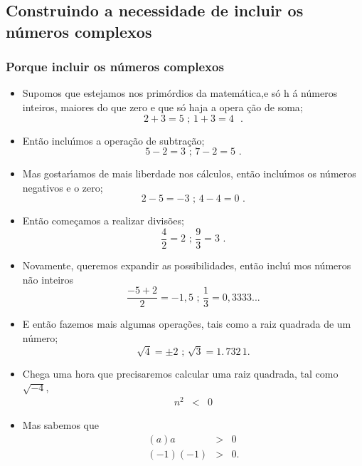 \documentclass[xcolor=table]{beamer}
\newenvironment{stepitemize}{\begin{itemize}[<+->]}{\end{itemize} }
\begin{document}
\subsection{Construindo a necessidade de incluir os n\'{u}meros complexos}

\begin{frame}%

\frametitle{Porque incluir os n\'{u}meros complexos}

\begin{stepitemize}
\item Supomos que estejamos nos prim\'{o}rdios da matem\'{a}tica,e s\'{o} h%
\'{a} n\'{u}meros inteiros, maiores do que zero e que s\'{o} haja a opera%
\c{c}\~{a}o de soma;%
\[
2+3=5\text{ \ ; \ \ }1+3=4\text{ \ \ \ }. 
\]

\item Ent\~{a}o inclu\'{\i}mos a opera\c{c}\~{a}o de subtra\c{c}\~{a}o;%
\[
5-2=3\text{ \ ; \ \ }7-2=5\text{ \ \ \ .} 
\]

\item Mas gostar\'{\i}amos de mais liberdade nos c\'{a}lculos, ent\~{a}o
inclu\'{\i}mos os n\'{u}meros negativos e o zero;%
\[
2-5=-3\text{ \ \ ; \ \ \ }4-4=0\text{ \ \ .} 
\]

\item Ent\~{a}o come\c{c}amos a realizar divis\~{o}es;%
\[
\frac{4}{2}=2\text{ \ \ ; \ \ \ \ }\frac{9}{3}=3\text{ \ \ \ \ .} 
\]
\end{stepitemize}

\transboxout%
\end{frame}%

\begin{frame}
\begin{stepitemize}
	\item Novamente, queremos expandir as possibilidades, ent\~{a}o inclu\'{\i}%
	mos n\'{u}meros n\~{a}o inteiros%
	\[
	\frac{-5+2}{2}=-1,5\text{ \ \ \ ; \ \ \ \ }\frac{1}{3}=0,3333... 
	\]
	
	\item E ent\~{a}o fazemos mais algumas opera\c{c}\~{o}es, tais como a raiz
	quadrada de um n\'{u}mero;%
	\[
	\sqrt{4}=\pm 2\text{ \ \ \ ; \ \ \ \ }\sqrt{3}=1.\,\allowbreak 732\,1. 
	\]
	
	\item Chega uma hora que precisaremos calcular uma raiz quadrada, tal como $%
	\sqrt{-4}$,%
	\begin{eqnarray*}
		n^{2} &<&0 
	\end{eqnarray*}
\item Mas sabemos que
\begin{eqnarray*}
	\left( a\right) a &>&0 \\
	\left( -1\right) \left( -1\right) &>&0\text{.}
\end{eqnarray*}
\end{stepitemize}
\end{frame}
\end{document}
